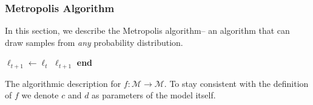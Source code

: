 \subsubsection{Metropolis Algorithm}
In this section, we describe the Metropolis algorithm-- an algorithm that can draw samples from \emph{any} probability
distribution.

\begin{algorithm}[t]
    \SetAlgoLined
    \DontPrintSemicolon
     {
        $\ell_{t+1} \gets \ell_t$ \;
        \Return $\ell_{t+1}$ \;
    }
    \textbf{end} \;
    \caption{The algorithmic description for $f: \mathcal{M} \rightarrow \mathcal{M}$.
    To stay consistent with the definition of $f$ we denote $c$ and $d$ as parameters of the model itself.}
    \label{alg:mutateFunction}
\end{algorithm}
